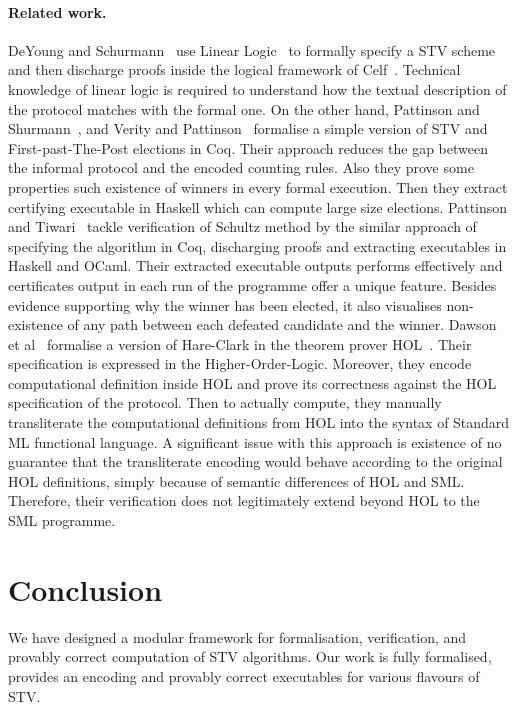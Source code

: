 \documentclass{llncs}
\begin{document}
\paragraph{\textbf{Related work.}}
DeYoung and Schurmann~\cite{DBLP:conf/voteid/2011} use Linear
Logic~\cite{DBLP:journals/apal/Girard93} to formally specify a STV
scheme and then discharge proofs inside the logical framework of
Celf~\cite{DBLP:conf/cade/Schack-NielsenS08}. Technical knowledge of
linear logic is required to understand how the textual description
of the protocol matches with the formal one. On the other hand,
Pattinson and Shurmann~\cite{DBLP:conf/ausai/PattinsonS15}, and
Verity and Pattinson~\cite{DBLP:conf/acsw/VerityP17} formalise a
simple version of STV and First-past-The-Post elections in Coq.
Their approach reduces the gap between the informal protocol and the
encoded counting rules. Also they prove some properties such
existence of winners in every formal execution. Then they extract
certifying executable in Haskell which can compute large size
elections. Pattinson and Tiwari~\cite{DBLP:conf/itp/PattinsonT17}
tackle verification of Schultz method by the similar approach of
specifying the algorithm in Coq, discharging proofs and extracting
executables in Haskell and OCaml. Their extracted executable outputs
performs effectively and certificates output in each run of the
programme offer a unique feature. Besides evidence supporting why
the winner has been elected, it also visualises non-existence of any
path between each defeated candidate and the winner. Dawson et
al~\cite{DBLP:conf/voteid/DawsonGM15} formalise a version of
Hare-Clark in the theorem prover HOL~\cite{hol4}. Their
specification is expressed in the Higher-Order-Logic. Moreover, they
encode computational definition inside HOL and prove its correctness
against the HOL specification of the protocol.  Then to actually
compute, they manually transliterate the computational definitions
from HOL into the syntax of Standard ML functional language.  A
significant issue with this approach is existence of no guarantee
that  the transliterate encoding would behave according to the
original HOL definitions, simply because of semantic differences of
HOL and SML. Therefore, their verification does not legitimately
extend beyond HOL to the SML programme. 

\section{Conclusion}
We have designed a modular framework for formalisation, verification, 
and provably correct computation of STV algorithms. Our work
is fully formalised, provides an encoding and provably correct
executables for various flavours of STV. 


\end{document}

